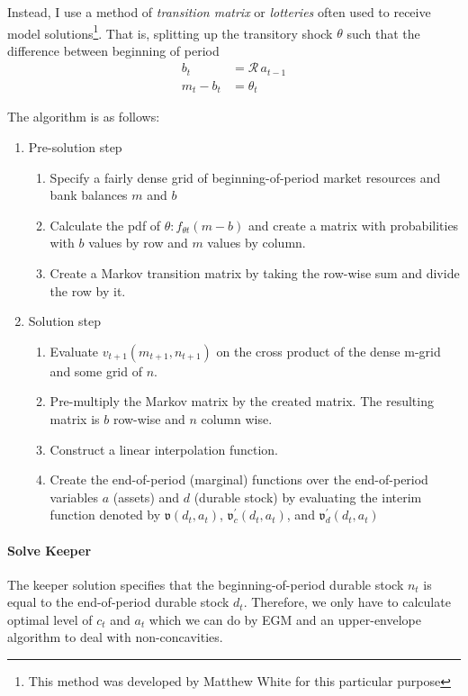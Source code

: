 Instead, I use a method of \textit{transition matrix} or \textit{lotteries} often used to receive model solutions\footnote{This method was developed by Matthew White for this particular purpose}. That is, splitting up the transitory shock $\theta$ such that the difference between beginning of period
\begin{align}
	b_t &= \mathcal{R}\, a_{t-1}\\
	m_t - b_t &= \theta_t
\end{align}

The algorithm is as follows:
\begin{enumerate}
	\item Pre-solution step
	\begin{enumerate}
		\item Specify a fairly dense grid of beginning-of-period market resources and bank balances $m$ and $b$
		\item Calculate the pdf of $\theta: f_{\theta t}(m - b)$ and create a matrix with probabilities with $b$ values by row and $m$ values by column.
		\item Create a Markov transition matrix by taking the row-wise sum and divide the row by it.
	\end{enumerate}
	\item Solution step
	\begin{enumerate}
		\item Evaluate $v_{t+1}(m_{t+1}, n_{t+1})$ on the cross product of the dense m-grid and some grid of $n$.
		\item Pre-multiply the Markov matrix by the created matrix. The resulting matrix is $b$ row-wise and $n$ column wise.
		\item Construct a linear interpolation function.
		\item Create the end-of-period (marginal) functions over the end-of-period variables $a$ (assets) and $d$ (durable stock) by evaluating the interim function denoted by $\mathfrak{v}(d_t, a_t)$, $\mathfrak{v}^{'}_c(d_t, a_t)$, and $\mathfrak{v}^{'}_d(d_t, a_t)$
	\end{enumerate}
\end{enumerate}


\paragraph{Solve Keeper}
The keeper solution specifies that the beginning-of-period durable stock $n_t$ is equal to the end-of-period durable stock $d_t$. Therefore, we only have to calculate optimal level of $c_t$ and $a_t$ which we can do by EGM and an upper-envelope algorithm to deal with non-concavities.


